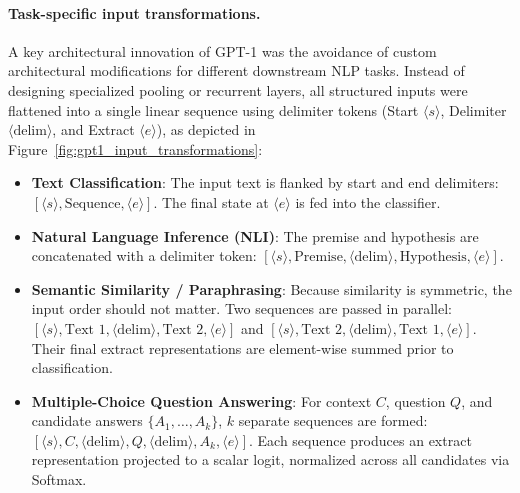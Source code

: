 \documentclass[../../main.tex]{subfiles}
\begin{document}
\paragraph{Task-specific input transformations.}
A key architectural innovation of GPT-1 was the avoidance of custom architectural modifications for different downstream NLP tasks. Instead of designing specialized pooling or recurrent layers, all structured inputs were flattened into a single linear sequence using delimiter tokens (Start $\langle s \rangle$, Delimiter $\langle\text{delim}\rangle$, and Extract $\langle e \rangle$), as depicted in Figure~\ref{fig:gpt1_input_transformations}:
\begin{itemize}
    \item \textbf{Text Classification}: The input text is flanked by start and end delimiters: $[\langle s \rangle, \text{Sequence}, \langle e \rangle]$. The final state at $\langle e \rangle$ is fed into the classifier.
    \item \textbf{Natural Language Inference (NLI)}: The premise and hypothesis are concatenated with a delimiter token: $[\langle s \rangle, \text{Premise}, \langle\text{delim}\rangle, \text{Hypothesis}, \langle e \rangle]$.
    \item \textbf{Semantic Similarity / Paraphrasing}: Because similarity is symmetric, the input order should not matter. Two sequences are passed in parallel: $[\langle s \rangle, \text{Text 1}, \langle\text{delim}\rangle, \text{Text 2}, \langle e \rangle]$ and $[\langle s \rangle, \text{Text 2}, \langle\text{delim}\rangle, \text{Text 1}, \langle e \rangle]$. Their final extract representations are element-wise summed prior to classification.
    \item \textbf{Multiple-Choice Question Answering}: For context $C$, question $Q$, and candidate answers $\{A_1, \dots, A_k\}$, $k$ separate sequences are formed: $[\langle s \rangle, C, \langle\text{delim}\rangle, Q, \langle\text{delim}\rangle, A_k, \langle e \rangle]$. Each sequence produces an extract representation projected to a scalar logit, normalized across all candidates via Softmax.
\end{itemize}
\end{document}
